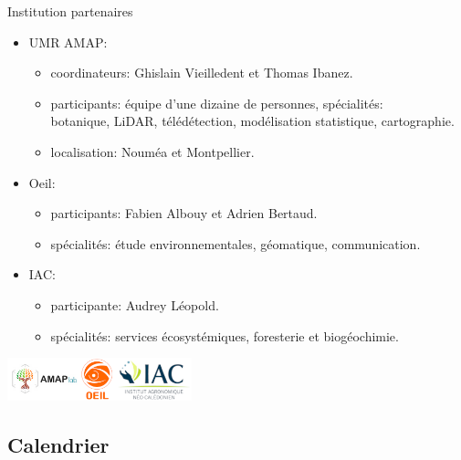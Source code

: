 \documentclass[10pt,table,dvipsnames,compress]{beamer}
\begin{document}
\begin{frame}[label={sec:orge9df2b0}]{Institution partenaires}
\begin{itemize}
\item UMR AMAP:
\begin{itemize}
\item coordinateurs: Ghislain Vieilledent et Thomas Ibanez.
\item participants: équipe d'une dizaine de personnes, spécialités: \\
botanique, LiDAR, télédétection, modélisation statistique, cartographie.
\item localisation: Nouméa et Montpellier.
\end{itemize}
\item Oeil:
\begin{itemize}
\item participants: Fabien Albouy et Adrien Bertaud.
\item spécialités: étude environnementales, géomatique, communication.
\end{itemize}
\item IAC:
\begin{itemize}
\item participante: Audrey Léopold.
\item spécialités: services écosystémiques, foresterie et biogéochimie.
\end{itemize}
\end{itemize}

\begin{center}
\includegraphics[width=0.4\textwidth]{figs/partners_logos.png}
\end{center}
\end{frame}

\subsection{Calendrier}
\label{sec:orgfb28043}
\end{document}
